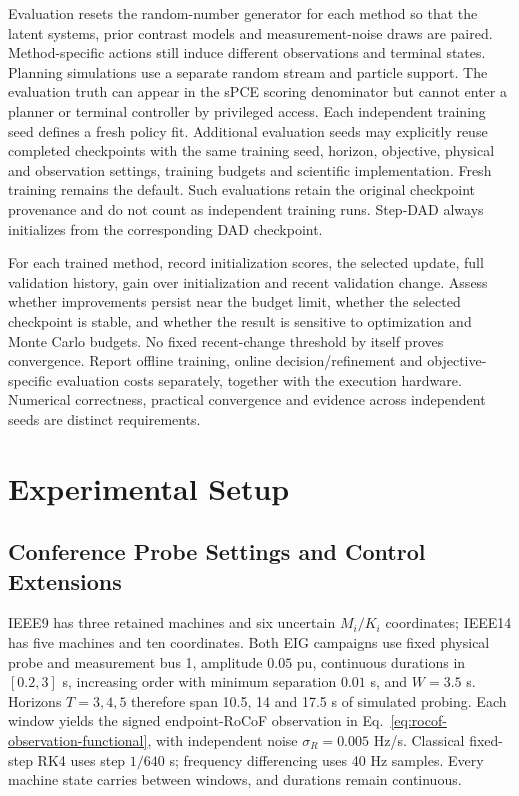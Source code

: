 \documentclass[journal]{IEEEtran}
\begin{document}
Evaluation resets the random-number generator for each method so that the
latent systems, prior contrast models and measurement-noise draws are paired.
Method-specific actions still induce different observations and terminal
states. Planning simulations use a separate random stream and particle support.
The evaluation truth can appear in the sPCE scoring denominator but cannot
enter a planner or terminal controller by privileged access. Each independent
training seed defines a fresh policy fit. Additional evaluation seeds may
explicitly reuse completed checkpoints with the same training seed, horizon,
objective, physical and observation settings, training budgets and scientific
implementation. Fresh training remains the default. Such evaluations retain
the original checkpoint provenance and do not count as independent training
runs. Step-DAD always initializes from the corresponding DAD checkpoint.

For each trained method, record initialization scores, the selected update,
full validation history, gain over initialization and recent validation change.
Assess whether improvements persist near the budget limit, whether the selected
checkpoint is stable, and whether the result is sensitive to optimization and
Monte Carlo budgets. No fixed recent-change threshold by itself proves
convergence. Report offline training, online decision/refinement and
objective-specific evaluation costs separately, together with the execution
hardware. Numerical correctness, practical convergence and evidence across
independent seeds are distinct requirements.

\section{Experimental Setup}
\label{sec:experimental-protocol}
\subsection{Conference Probe Settings and Control Extensions}
IEEE9 has three retained machines and six uncertain $M_i/K_i$ coordinates;
IEEE14 has five machines and ten coordinates. Both EIG campaigns use fixed
physical probe and measurement bus 1, amplitude $0.05$ pu, continuous
durations in $[0.2,3]$ s, increasing order with minimum separation $0.01$ s,
and $W=3.5$ s. Horizons $T=3,4,5$ therefore span 10.5, 14 and 17.5 s of
simulated probing. Each window yields the signed endpoint-RoCoF observation
in Eq.~\eqref{eq:rocof-observation-functional}, with independent noise
$\sigma_R=0.005$ Hz/s. Classical fixed-step RK4 uses step $1/640$ s;
frequency differencing uses 40 Hz samples. Every machine state carries
between windows, and durations remain continuous.
\end{document}
